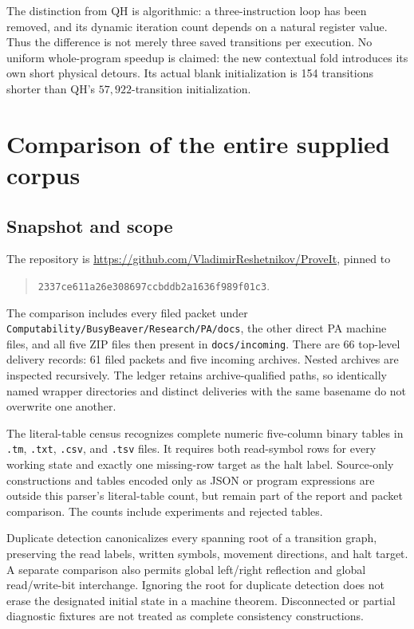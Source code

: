 \documentclass[11pt,letterpaper]{article}
\newcommand{\file}[1]{\texttt{\nolinkurl{#1}}}
\begin{document}
The distinction from QH is algorithmic: a three-instruction loop has
been removed, and its dynamic iteration count depends on a natural
register value. Thus the difference is not merely three saved transitions
per execution. No uniform whole-program speedup is claimed: the new
contextual fold introduces its own short physical detours. Its actual
blank initialization is 154 transitions shorter than QH's
$57,922$-transition initialization.

\section{Comparison of the entire supplied corpus}\label{sec:comparison}

\subsection{Snapshot and scope}

The repository is \url{https://github.com/VladimirReshetnikov/ProveIt},
pinned to
\begin{quote}\small
\nolinkurl{2337ce611a26e308697ccbddb2a1636f989f01c3}.
\end{quote}
The comparison includes every filed packet under
\file{Computability/BusyBeaver/Research/PA/docs}, the other direct PA
machine files, and all five ZIP files then present in \file{docs/incoming}.
There are 66 top-level delivery records: 61 filed packets and five
incoming archives. Nested archives are inspected recursively. The ledger
retains archive-qualified paths, so identically named wrapper directories
and distinct deliveries with the same basename do not overwrite one another.

The literal-table census recognizes complete numeric five-column binary
tables in \file{.tm}, \file{.txt}, \file{.csv}, and \file{.tsv} files.
It requires both read-symbol rows for every working state and exactly
one missing-row target as the halt label. Source-only constructions and
tables encoded only as JSON or program expressions are outside this
parser's literal-table count, but remain part of the report and packet
comparison. The counts include experiments and rejected tables.



Duplicate detection canonicalizes every spanning root of a transition
graph, preserving the read labels, written symbols, movement directions,
and halt target. A separate comparison also permits global left/right
reflection and global read/write-bit interchange. Ignoring the root for
duplicate detection does not erase the designated initial state in a
machine theorem. Disconnected or partial diagnostic fixtures are not
treated as complete consistency constructions.
\end{document}
